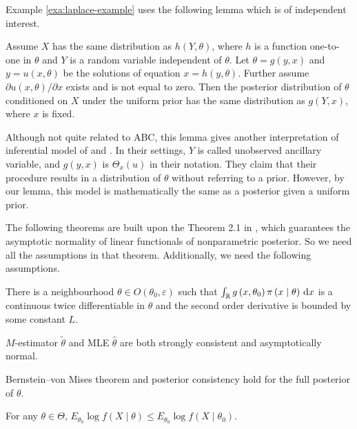 Example \ref{exa:laplace-example} uses the following lemma which
is of independent interest. 
\begin{lem}
\label{lem:bayes-inferential-model}Assume $X$ has the same distribution
as $h\left(Y,\theta\right)$, where $h$ is a function one-to-one
in $\theta$ and $Y$ is a random variable independent of $\theta$.
Let $\theta=g\left(y,x\right)$ and $y=u\left(x,\theta\right)$ be
the solutions of equation $x=h\left(y,\theta\right)$. Further assume
$\partial u\left(x,\theta\right)/\partial x$ exists and is not equal
to zero. Then the posterior distribution of $\theta$ conditioned
on $X$ under the uniform prior has the same distribution as $g\left(Y,x\right)$,
where $x$ is fixed. \end{lem}
\begin{rem}
Although not quite related to ABC, this lemma gives another interpretation
of inferential model of \citet{martin2013inferential} and \citet{martin2015conditional}.
In their settings, $Y$ is called unobserved ancillary variable, and
$g\left(y,x\right)$ is $\Theta_{x}\left(u\right)$ in their notation.
They claim that their procedure results in a distribution of $\theta$
without referring to a prior. However, by our lemma, this model is
mathematically the same as a posterior given a uniform prior.
\end{rem}
The following theorems are built upon the Theorem 2.1 in \citet{rivoirard2012bernstein},
which guarantees the asymptotic normality of linear functionals of
nonparametric posterior. So we need all the assumptions in that theorem.
Additionally, we need the following assumptions. 
\begin{assumption}
\label{assu:second-order-bounded-differential}There is a neighbourhood
$\theta\in O\left(\theta_{0},\varepsilon\right)$ such that $\int_{\mathbb{R}}g\left(x,\theta_{0}\right)\pi\left(x\mid\theta\right)\,\mathrm{d} x$
is a continuous twice differentiable in $\theta$ and the second order
derivative is bounded by some constant $L$. 
\begin{assumption}
\label{assu:m-est-consistent-asymp-norml}$M$-estimator $\tilde{\theta}$
and MLE $\hat{\theta}$ are both strongly consistent and asymptotically
normal.
\begin{assumption}
\label{assu:bernstein-von-mises-full-posterior} Bernstein--von Mises
theorem and posterior consistency hold for the full posterior of $\theta$.
\begin{assumption}
\label{assu:theo-mle}For any $\theta\in\Theta$, $E_{\theta_{0}}\log f\left(X\mid\theta\right)\le E_{\theta_{0}}\log f\left(X\mid\theta_{0}\right)$. 
\end{assumption}
\end{assumption}
\end{assumption}
\end{assumption}
